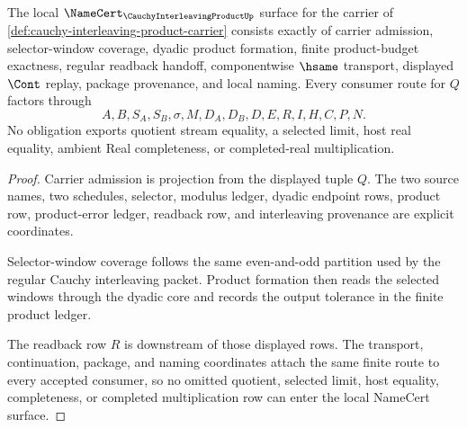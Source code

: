 \begin{theorem}
\label{thm:cauchy-interleaving-product-namecert-obligations}
The local $\NameCert_{\CauchyInterleavingProductUp}$ surface for the carrier of \autoref{def:cauchy-interleaving-product-carrier} consists exactly of carrier admission, selector-window coverage, dyadic product formation, finite product-budget exactness, regular readback handoff, componentwise $\hsame$ transport, displayed $\Cont$ replay, package provenance, and local naming. Every consumer route for $Q$ factors through
$$
A,B,S_A,S_B,\sigma,M,D_A,D_B,D,E,R,I,H,C,P,N.
$$
No obligation exports quotient stream equality, a selected limit, host real equality, ambient Real completeness, or completed-real multiplication.
\end{theorem}
\begin{proof}
Carrier admission is projection from the displayed tuple $Q$. The two source names, two schedules, selector, modulus ledger, dyadic endpoint rows, product row, product-error ledger, readback row, and interleaving provenance are explicit coordinates.

Selector-window coverage follows the same even-and-odd partition used by the regular Cauchy interleaving packet. Product formation then reads the selected windows through the dyadic core and records the output tolerance in the finite product ledger.

The readback row $R$ is downstream of those displayed rows. The transport, continuation, package, and naming coordinates attach the same finite route to every accepted consumer, so no omitted quotient, selected limit, host equality, completeness, or completed multiplication row can enter the local NameCert surface.
\end{proof}

